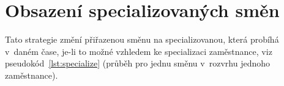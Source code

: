 \documentclass[twoside]{ctuthesis}
\begin{document}

%
%


\section{Obsazení specializovaných směn}
Tato strategie změní přiřazenou směnu na specializovanou, která probíhá v~daném čase, je-li to možné vzhledem ke specializaci zaměstnance, viz pseudokód~\ref{lst:specialize} (průběh pro jednu směnu v~rozvrhu jednoho zaměstnance).
\end{document}
